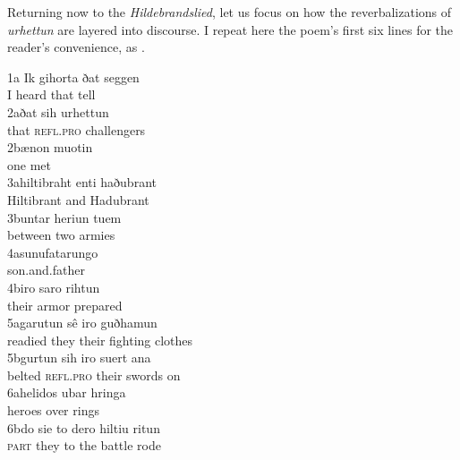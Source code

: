 Returning now to the \textit{Hildebrandslied}, let us focus on how the reverbalizations of \textit{urhettun} are layered into discourse. I repeat here the poem’s first six lines for the reader’s convenience, as .

\ea%
    \label{ex:6:22}
1a \tab \gll Ik  gihorta  ðat  seggen\\
             I  heard   that  tell\\

2a\tab \gll ðat     sih       urhettun\\
            that   \textsc{refl.pro}   challengers\\

2b\tab \gll ænon   muotin\\
            one     met\\

3a\tab \gll hiltibraht  enti    haðubrant\\
            Hiltibrant   and    Hadubrant\\

3b\tab \gll untar     heriun  tuem\\
            between   two     armies\\

4a\tab \gll sunufatarungo\\
            son.and.father\\

4b\tab \gll iro    saro   rihtun\\
            their   armor  prepared\\

5a\tab \gll garutun  sê    iro     guðhamun\\
            readied  they    their   {fighting clothes}\\

5b\tab \gll gurtun  sih        iro     suert  ana\\
            belted   \textsc{refl.pro}  their  swords   on\\

6a\tab \gll helidos   ubar  hringa\\
           heroes  over   rings\\

6b\tab \gll do     sie    to  dero   hiltiu  ritun\\
            \textsc{part}  they   to  the    battle  rode\\
\z

